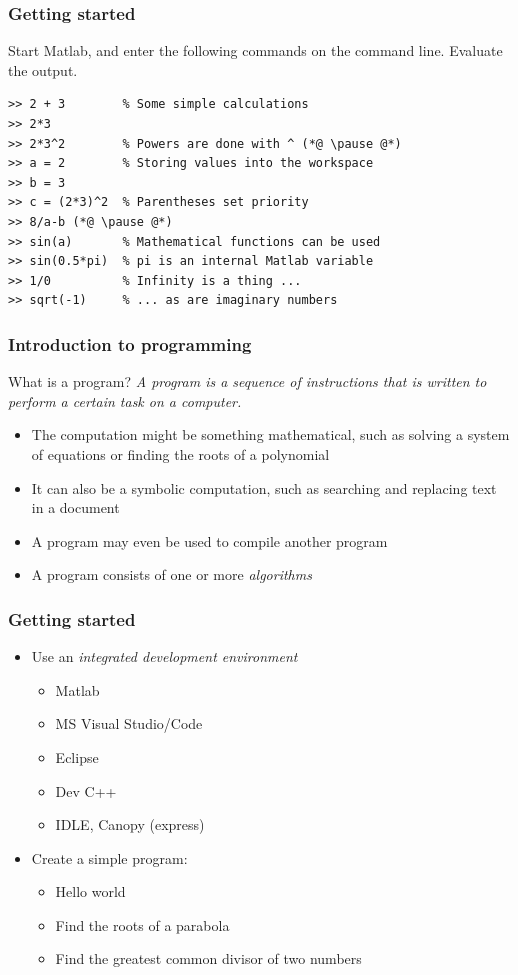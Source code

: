 \documentclass[11pt,table,final,fleqn,xcolor={usenames,dvipsnames},unknownkeysallowed,handout]{beamer}
\begin{document}
\begin{frame}[fragile]
 \frametitle{Getting started}
  Start Matlab, and enter the following commands on the command line. Evaluate the output.
  \pause
  \begin{lstlisting}
>> 2 + 3        % Some simple calculations
>> 2*3
>> 2*3^2        % Powers are done with ^ (*@ \pause @*)
>> a = 2        % Storing values into the workspace
>> b = 3
>> c = (2*3)^2  % Parentheses set priority
>> 8/a-b (*@ \pause @*)
>> sin(a)       % Mathematical functions can be used 
>> sin(0.5*pi)  % pi is an internal Matlab variable
>> 1/0          % Infinity is a thing ...
>> sqrt(-1)     % ... as are imaginary numbers
  \end{lstlisting}
\end{frame}

\begin{frame}
 \frametitle{Introduction to programming}
 \begin{block}{What is a program?}
  \emph{A program is a sequence of instructions that is written to perform a certain task on a computer.} %
  \end{block}
  \begin{itemize}
    \item The computation might be something mathematical, such as solving a system of equations or finding the roots of a polynomial
    \item It can also be a symbolic computation, such as searching and replacing text in a document 
    \item A program may even be used to compile another program
    \item A program consists of one or more \emph{algorithms}
  \end{itemize}
\end{frame}

\begin{frame}
 \frametitle{Getting started}
 \begin{itemize}
   \item Use an \emph{integrated development environment}
   \begin{itemize}
     \item Matlab
     \item MS Visual Studio/Code
     \item Eclipse
     \item Dev C++
     \item IDLE, Canopy (express)
   \end{itemize}
   \item Create a simple program:
   \begin{itemize}
     \item Hello world
     \item Find the roots of a parabola
     \item Find the greatest common divisor of two numbers
   \end{itemize}
 \end{itemize}
\end{frame}
\end{document}
